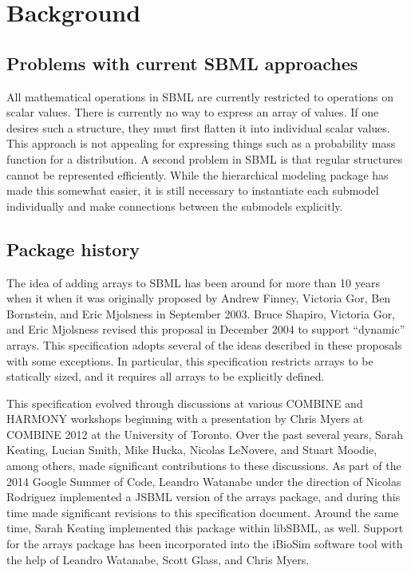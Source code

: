 
\section{ Background }
\label{background}

\subsection{ Problems with current SBML approaches }

All mathematical operations in SBML are currently restricted to operations on scalar values.  There is currently no way to express an array of values.  If one desires such a structure, they must first flatten it into individual scalar values.  This approach is not appealing for expressing things such as a probability mass function for a distribution.  A second problem in SBML is that regular structures cannot be represented efficiently.  While the hierarchical modeling package has made this somewhat easier, it is still necessary to instantiate each submodel individually and make connections between the submodels explicitly.  

\subsection{Package history}

The idea of adding arrays to SBML has been around for more than 10 years when it when it was originally proposed by Andrew Finney, Victoria Gor, Ben Bornstein, and Eric Mjolsness in September 2003.   Bruce Shapiro, Victoria Gor, and Eric Mjolsness revised this proposal in December 2004 to support ``dynamic'' arrays.  This specification adopts several of the ideas described in these proposals with some exceptions.  In particular, this specification restricts arrays to be statically sized, and it requires all arrays to be explicitly defined.  

This specification evolved through discussions at various COMBINE and HARMONY workshops beginning with a presentation by Chris Myers at COMBINE 2012 at the University of Toronto.  Over the past several years, Sarah Keating, Lucian Smith, Mike Hucka, Nicolas LeNovere, and Stuart Moodie, among others, made significant contributions to these discussions.  As part of the 2014 Google Summer of Code, Leandro Watanabe under the direction of Nicolas Rodriguez implemented a JSBML version of the arrays package, and during this time made significant revisions to this specification document.  Around the same time, Sarah Keating implemented this package within libSBML, as well.  Support for the arrays package has been incorporated into the iBioSim software tool with the help of Leandro Watanabe, Scott Glass, and Chris Myers.

